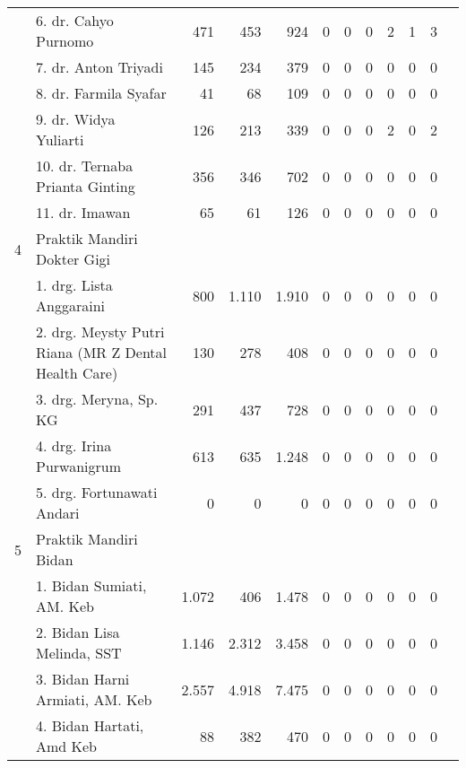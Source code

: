 {\begin{small}
\begin{tabular}{cY{30em}rrrrrrrrrr}
	& 6. dr. Cahyo Purnomo                                 &    471 &     453 &     924 &      0 &      0 &     0 &     2 &     1 &     3 \\
	& 7. dr. Anton Triyadi                                 &    145 &     234 &     379 &      0 &      0 &     0 &     0 &     0 &     0 \\
	& 8. dr. Farmila Syafar                                &     41 &      68 &     109 &      0 &      0 &     0 &     0 &     0 &     0 \\
	& 9. dr. Widya Yuliarti                                &    126 &     213 &     339 &      0 &      0 &     0 &     2 &     0 &     2 \\
	& 10. dr. Ternaba Prianta Ginting                      &    356 &     346 &     702 &      0 &      0 &     0 &     0 &     0 &     0 \\
	& 11. dr. Imawan                                       &     65 &      61 &     126 &      0 &      0 &     0 &     0 &     0 &     0 \\
	4 & Praktik Mandiri Dokter Gigi & & & & & & & & & \\
	& 1. drg. Lista Anggaraini                             &    800 &   1.110 &   1.910 &      0 &      0 &     0 &     0 &     0 &     0 \\
	& 2. drg. Meysty Putri Riana (MR Z Dental Health Care) &    130 &     278 &     408 &      0 &      0 &     0 &     0 &     0 &     0 \\
	& 3. drg. Meryna, Sp. KG                               &    291 &     437 &     728 &      0 &      0 &     0 &     0 &     0 &     0 \\
	& 4. drg. Irina Purwanigrum                            &    613 &     635 &   1.248 &      0 &      0 &     0 &     0 &     0 &     0 \\
	& 5. drg. Fortunawati Andari                           &      0 &       0 &       0 &      0 &      0 &     0 &     0 &     0 &     0 \\
  	5 & Praktik Mandiri Bidan & & & & & & & & & \\
	& 1. Bidan Sumiati, AM. Keb                            &  1.072 &     406 &   1.478 &      0 &      0 &     0 &     0 &     0 &     0 \\
	& 2. Bidan Lisa Melinda, SST                           &  1.146 &   2.312 &   3.458 &      0 &      0 &     0 &     0 &     0 &     0 \\
	& 3. Bidan Harni Armiati, AM. Keb                      &  2.557 &   4.918 &   7.475 &      0 &      0 &     0 &     0 &     0 &     0 \\
	& 4. Bidan Hartati, Amd Keb                            &     88 &     382 &     470 &      0 &      0 &     0 &     0 &     0 &     0 \\
    \end{tabular}%
\end{small}

}


